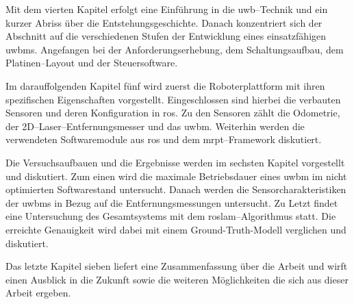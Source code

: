 Mit dem vierten Kapitel erfolgt eine Einführung in die \Gls{uwb}--Technik und ein kurzer Abriss über die Entstehungsgeschichte. Danach konzentriert sich der Abschnitt auf die verschiedenen Stufen der Entwicklung eines einsatzfähigen \Gls{uwbm}s. Angefangen bei der Anforderungserhebung, dem Schaltungsaufbau, dem Platinen--Layout und der Steuersoftware.

Im darauffolgenden Kapitel fünf wird zuerst die Roboterplattform mit ihren spezifischen Eigenschaften vorgestellt. Eingeschlossen sind hierbei die verbauten Sensoren und deren Konfiguration in \Gls{ros}. Zu den Sensoren zählt die Odometrie, der 2D--Laser--Entfernungsmesser und das \Gls{uwbm}. Weiterhin werden die verwendeten Softwaremodule aus \Gls{ros} und dem \Gls{mrpt}--Framework diskutiert.

Die Versuchsaufbauen und die Ergebnisse werden im sechsten Kapitel vorgestellt und diskutiert. Zum einen wird die maximale Betriebsdauer eines \Gls{uwbm} im nicht optimierten Softwarestand untersucht. Danach werden die Sensorcharakteristiken der \Glspl{uwbm} in Bezug auf die Entfernungsmessungen untersucht. Zu Letzt findet eine Untersuchung des Gesamtsystems mit dem \Gls{roslam}--Algorithmus statt. Die erreichte Genauigkeit wird dabei mit einem Ground-Truth-Modell verglichen und diskutiert.

Das letzte Kapitel sieben liefert eine Zusammenfassung über die Arbeit und wirft einen Ausblick in die Zukunft sowie die weiteren Möglichkeiten die sich aus dieser Arbeit ergeben.


